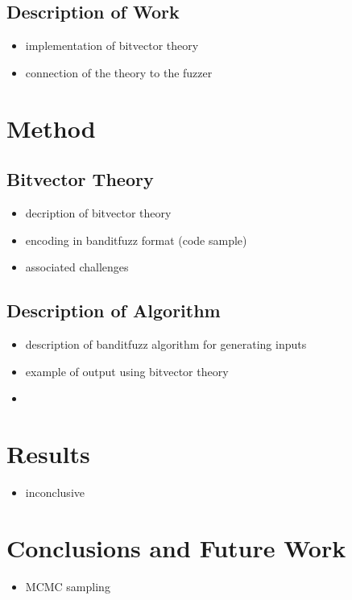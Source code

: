 \documentclass[article,11pt]{article}
\begin{document}
\subsection*{Description of Work}
\label{sec:org5cb5eef}
\begin{itemize}
\item implementation of bitvector theory\\
\item connection of the theory to the fuzzer\\
\end{itemize}

\section*{Method}
\label{sec:org5aa2de1}
\subsection*{Bitvector Theory}
\label{sec:org46fb590}
\begin{itemize}
\item decription of bitvector theory\\
\item encoding in banditfuzz format (code sample)\\
\item associated challenges\\
\end{itemize}
\subsection*{Description of Algorithm}
\label{sec:org8246515}
\begin{itemize}
\item description of banditfuzz algorithm for generating inputs\\
\item example of output using bitvector theory\\
\item 
\end{itemize}
\section*{Results}
\label{sec:orge2768a8}
\begin{itemize}
\item inconclusive\\
\end{itemize}
\section*{Conclusions and Future Work}
\label{sec:org7b5ae89}
\begin{itemize}
\item MCMC sampling\\
\end{itemize}
\end{document}
